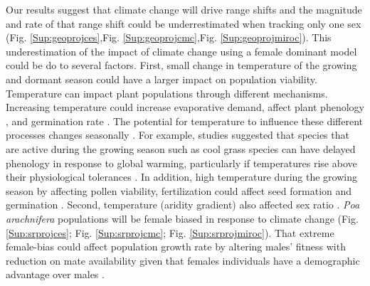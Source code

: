 \documentclass[12pt]{article}
\newcommand{\tom}[2]{{\color{red}{#1}}\footnote{\textit{\color{red}{#2}}}}
\begin{document}
Our results suggest that climate change will drive range shifts and the magnitude and rate of that range shift could be underrestimated when tracking only one sex (Fig. \ref{Sup:geoprojces},Fig. \ref{Sup:geoprojcmc},Fig. \ref{Sup:geoprojmiroc}). 
This underestimation of the impact of climate change using a female dominant model could be do to several factors.
First, small change in temperature of the growing and dormant season could have a larger  impact on population viability.
Temperature can impact plant populations through different mechanisms.
Increasing temperature could increase evaporative demand, affect plant phenology \citep{mclean2016predicting,sherry2007divergence,iler2019reproductive}, and germination rate \citep{reed2021climate}.
The potential for temperature to influence these different processes changes seasonally \citep{konapala2020climate}.
For example, studies suggested that species that are active during the growing season such as cool grass species can have delayed phenology in response to global warming, particularly if temperatures rise above their physiological tolerances \citep{cleland2007shifting,williams2015life}.
In addition, high temperature during the growing season by affecting pollen viability, fertilization could affect seed formation and germination \citep{hatfield2015temperature,sletvold2015climate}.
Second, temperature (aridity gradient) also affected sex ratio \citep{hultine2016climate}.
\emph{Poa arachnifera} populations will be female biased in response to climate change (Fig. \ref{Sup:srprojces}; Fig. \ref{Sup:srprojcmc}; Fig. \ref{Sup:srprojmiroc}). 
That extreme female-bias could affect population growth rate by altering males’ fitness with reduction on mate availability given that females individuals have a demographic advantage over males \citep{knight2005pollen,haridas2014frequency}.


\end{document}
